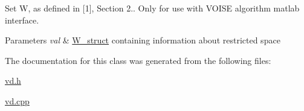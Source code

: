 Set W, as defined in \mbox{[}1\mbox{]}, Section 2.. Only for use with V\+O\+I\+SE algorithm matlab interface. 
\begin{DoxyParams}{Parameters}
{\em val} & \mbox{\hyperlink{structW__struct}{W\+\_\+struct}} containing information about restricted space \\
\hline
\end{DoxyParams}


The documentation for this class was generated from the following files\+:\begin{DoxyCompactItemize}
\item 
\mbox{\hyperlink{vd_8h}{vd.\+h}}\item 
\mbox{\hyperlink{vd_8cpp}{vd.\+cpp}}\end{DoxyCompactItemize}
